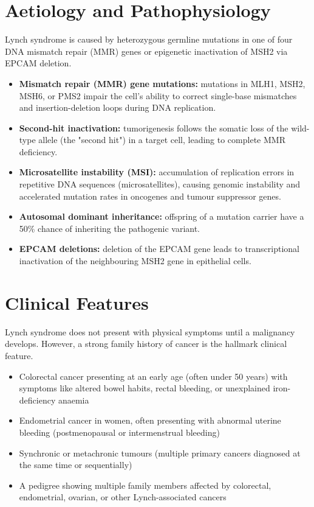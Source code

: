 \section*{Aetiology and Pathophysiology}
Lynch syndrome is caused by heterozygous germline mutations in one of four DNA mismatch repair (MMR) genes or epigenetic inactivation of MSH2 via EPCAM deletion.
\begin{itemize}
    \item \textbf{Mismatch repair (MMR) gene mutations:} mutations in MLH1, MSH2, MSH6, or PMS2 impair the cell's ability to correct single-base mismatches and insertion-deletion loops during DNA replication.
    \item \textbf{Second-hit inactivation:} tumorigenesis follows the somatic loss of the wild-type allele (the "second hit") in a target cell, leading to complete MMR deficiency.
    \item \textbf{Microsatellite instability (MSI):} accumulation of replication errors in repetitive DNA sequences (microsatellites), causing genomic instability and accelerated mutation rates in oncogenes and tumour suppressor genes.
    \item \textbf{Autosomal dominant inheritance:} offspring of a mutation carrier have a 50\% chance of inheriting the pathogenic variant.
    \item \textbf{EPCAM deletions:} deletion of the EPCAM gene leads to transcriptional inactivation of the neighbouring MSH2 gene in epithelial cells.
\end{itemize}

\section*{Clinical Features}
Lynch syndrome does not present with physical symptoms until a malignancy develops. However, a strong family history of cancer is the hallmark clinical feature.
\begin{itemize}
    \item Colorectal cancer presenting at an early age (often under 50 years) with symptoms like altered bowel habits, rectal bleeding, or unexplained iron-deficiency anaemia
    \item Endometrial cancer in women, often presenting with abnormal uterine bleeding (postmenopausal or intermenstrual bleeding)
    \item Synchronic or metachronic tumours (multiple primary cancers diagnosed at the same time or sequentially)
    \item A pedigree showing multiple family members affected by colorectal, endometrial, ovarian, or other Lynch-associated cancers
\end{itemize}

